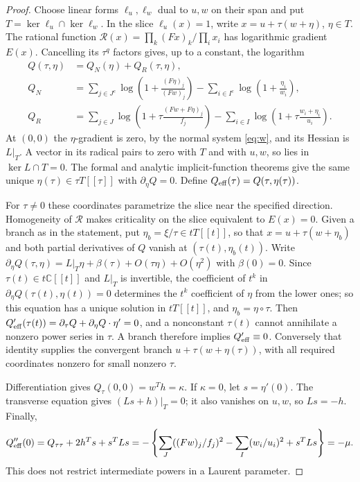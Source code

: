 \documentclass[11pt]{article}
\theoremstyle{remark}\newtheorem{remark}[theorem]{Remark}
\newcommand{\C}{\mathbb C}\newcommand{\Q}{\mathbb Q}
\begin{document}
\begin{proof}
Choose linear forms $\ell_u,\ell_w$ dual to $u,w$ on their span and put
$T=\ker\ell_u\cap\ker\ell_w$. In the slice $\ell_u(x)=1$, write
$x=u+\tau(w+\eta)$, $\eta\in T$. The rational function
$\mathcal R(x)=\prod_k(Fx)_k/\prod_i x_i$ has logarithmic gradient $E(x)$.
Cancelling its $\tau^q$ factors gives, up to a constant, the logarithm
\begin{align*}
 Q(\tau,\eta)&=Q_N(\eta)+Q_R(\tau,\eta),\\
 Q_N&=\sum_{j\in J^c}\log\left(1+\frac{(F\eta)_j}{(Fw)_j}\right)
       -\sum_{i\in I^c}\log\left(1+\frac{\eta_i}{w_i}\right),\\
 Q_R&=\sum_{j\in J}\log\left(1+\tau\frac{(Fw+F\eta)_j}{f_j}\right)
       -\sum_{i\in I}\log\left(1+\tau\frac{w_i+\eta_i}{u_i}\right).
\end{align*}
At $(0,0)$ the $\eta$-gradient is zero, by the normal system \eqref{eq:w},
and its Hessian is $L|_T$.
A vector in its radical pairs to zero with $T$ and with $u,w$, so lies
in $\ker L\cap T=0$. The formal and analytic implicit-function theorems
give the same unique $\eta(\tau)\in\tau T[[\tau]]$ with
$\partial_\eta Q=0$. Define $Q_{\rm eff}(\tau)=Q(\tau,\eta(\tau))$.

For $\tau\ne0$ these coordinates parametrize the slice near the specified
direction. Homogeneity of $\mathcal R$ makes criticality on the slice
equivalent to $E(x)=0$. Given a branch as in the statement, put
$\eta_b=\xi/\tau\in tT[[t]]$, so that $x=u+\tau(w+\eta_b)$ and both
partial derivatives of $Q$ vanish at $(\tau(t),\eta_b(t))$. Write
$\partial_\eta Q(\tau,\eta)=L|_T\eta+\beta(\tau)+O(\tau\eta)+O(\eta^2)$ with
$\beta(0)=0$. Since $\tau(t)\in t\C[[t]]$ and $L|_T$ is invertible, the
coefficient of $t^k$ in $\partial_\eta Q(\tau(t),\eta(t))=0$ determines the
$t^k$ coefficient of $\eta$ from the lower ones; so this equation has a
unique solution in $tT[[t]]$, and $\eta_b=\eta\circ\tau$. Then
$Q_{\rm eff}'(\tau(t))=\partial_\tau Q+\partial_\eta Q\cdot\eta'=0$, and a
nonconstant $\tau(t)$ cannot annihilate a nonzero power series in $\tau$.
A branch therefore implies
$Q_{\rm eff}'\equiv0$. Conversely that identity supplies the convergent
branch $u+\tau(w+\eta(\tau))$, with all required coordinates nonzero
for small nonzero $\tau$.

Differentiation gives $Q_\tau(0,0)=w^Th=\kappa$.
If $\kappa=0$, let $s=\eta'(0)$. The transverse equation gives
$(Ls+h)|_T=0$; it also vanishes on $u,w$, so $Ls=-h$. Finally,
\[
 Q_{\rm eff}''(0)=Q_{\tau\tau}+2h^Ts+s^TLs
 =-\left\{\sum_J((Fw)_j/f_j)^2-\sum_I(w_i/u_i)^2+s^TLs\right\}=-\mu.
\]
This does not restrict intermediate powers in a Laurent parameter.
\end{proof}
\end{document}
